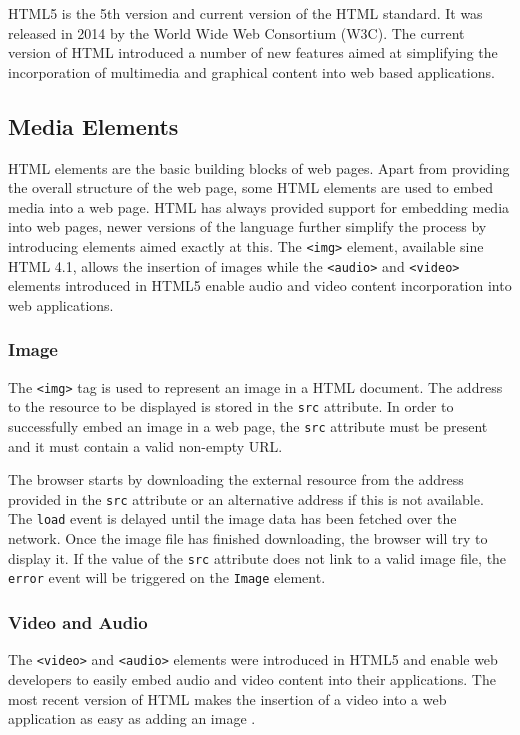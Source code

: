 \documentclass[10pt,a4paper,twoside]{book}
\begin{document}
HTML5 is the 5th version and current version of the HTML standard. It was released in 2014 by the World Wide Web Consortium (W3C). The current version of HTML introduced a number of new features aimed at simplifying the incorporation of multimedia and graphical content into web based applications\cite{berjon2014html}.

\subsection{Media Elements}
HTML elements are the basic building blocks of web pages. Apart from providing the overall structure of the web page, some HTML elements are used to embed media into a web page. HTML has always provided support for embedding media into web pages, newer versions of the language further simplify the process by introducing elements aimed exactly at this. The \texttt{<img>} element, available sine HTML 4.1, allows the insertion of images while the \texttt{<audio>} and \texttt{<video>} elements introduced in HTML5 enable audio and video content incorporation into web applications.

\subsubsection{Image}
The \texttt{<img>} tag is used to represent an image in a HTML document. The address to the resource to be displayed is stored in the \texttt{src} attribute. In order to successfully embed an image in a web page, the \texttt{src} attribute must be present and it must contain a valid non-empty URL\cite{berjon2014html}.

The browser starts by downloading the external resource from the address provided in the \texttt{src} attribute or an alternative address if this is not available. The \texttt{load} event is delayed until the image data has been fetched over the network. Once the image file has finished downloading, the browser will try to display it. If the value of the \texttt{src} attribute does not link to a valid image file, the \texttt{error} event will be triggered on the \texttt{Image} element\cite{berjon2014html}.

\subsubsection{Video and Audio}
The \texttt{<video>} and \texttt{<audio>} elements were introduced in HTML5 and enable web developers to easily embed audio and video content into their applications. The most recent version of HTML makes the insertion of a video into a web application as easy as adding an image \cite{berjon2014html}.
\end{document}
